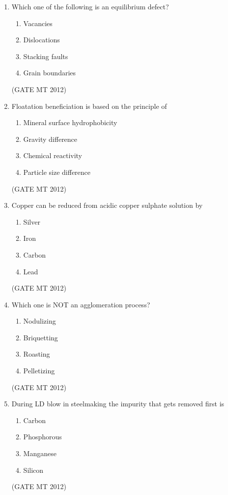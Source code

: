 \documentclass[journal, 11pt, onecolumn]{IEEEtran}
\theoremstyle{remark}
\begin{document}
\begin{enumerate}
\begin{enumerate}
\item Which one of the following is an equilibrium defect?
\begin{multicols}{4}
\begin{enumerate}  
\item Vacancies
\item Dislocations
\item Stacking faults
\item Grain boundaries
\end{enumerate}
\end{multicols}
\hfill(GATE MT 2012)

\item Floatation beneficiation is based on the principle of  
\begin{multicols}{2}
\begin{enumerate}  
\item Mineral surface hydrophobicity
\item Gravity difference
\item Chemical reactivity
\item Particle size difference
\end{enumerate}
\end{multicols}
\hfill(GATE MT 2012)
 

\item Copper can be reduced from acidic copper sulphate solution by  
\begin{multicols}{4}
\begin{enumerate}  
\item Silver
\item Iron
\item Carbon
\item Lead
\end{enumerate}
\end{multicols}
\hfill(GATE MT 2012)
 

\item Which one is NOT an agglomeration process?  
\begin{multicols}{4}
\begin{enumerate}  
\item Nodulizing
\item Briquetting
\item Roasting
\item Pelletizing
\end{enumerate}
\end{multicols}
\hfill(GATE MT 2012)
 

\item During LD blow in steelmaking the impurity that gets removed first is  
\begin{multicols}{4}
\begin{enumerate}  
\item Carbon
\item Phosphorous
\item Manganese
\item Silicon
\end{enumerate}
\end{multicols}
\hfill(GATE MT 2012)
 


\end{enumerate}
\end{enumerate}
\end{document}
